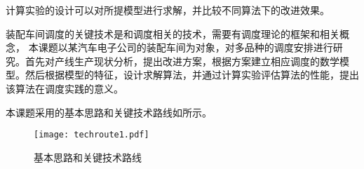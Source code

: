 计算实验的设计可以对所提模型进行求解，并比较不同算法下的改进效果。

装配车间调度的关键技术是和调度相关的技术，需要有调度理论的框架和相关概念，
本课题以某汽车电子公司的装配车间为对象，对多品种的调度安排进行研究。首先对产线生产现状分析，提出改进方案，根据方案建立相应调度的数学模型。然后根据模型的特征，设计求解算法，并通过计算实验评估算法的性能，提出该算法在调度实践的意义。


本课题采用的基本思路和关键技术路线如所示。
\begin{figure}[h]
\centering
\texttt{[image: techroute1.pdf]}
\caption{基本思路和关键技术路线\label{fig:1}}
\end{figure}